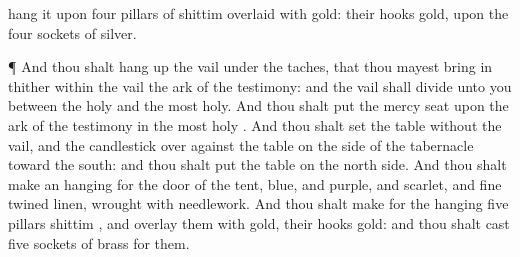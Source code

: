 {hang it upon
four
pillars of
shittim
{}
overlaid with
gold: their
hooks
{}
gold, upon the
four
sockets of
silver.
\par }{\PP {}¶ And thou shalt hang
up the
vail under the
taches, that thou mayest
bring in thither
within the
vail the
ark of the
testimony: and the
vail shall
divide unto you between the
holy
{} and the
most
holy.
And thou shalt
put the mercy
seat upon the
ark of the
testimony in the
most
holy
{}.
And thou shalt
set the
table
without the
vail, and the
candlestick over
against the
table on the
side of the
tabernacle toward the
south: and thou shalt
put the
table on the
north
side.
And thou shalt
make an
hanging for the
door of the
tent,
{}
blue, and
purple, and
scarlet, and fine
twined
linen,
wrought with
needlework.
And thou shalt
make for the
hanging
five
pillars
{}
shittim
{}, and
overlay them with
gold,
{} their
hooks
{}
gold: and thou shalt
cast
five
sockets of
brass for them.

}
